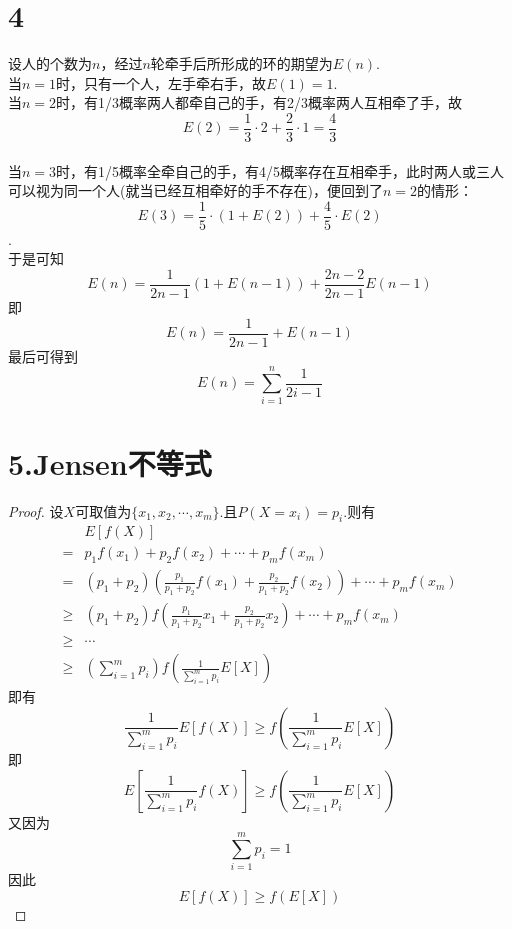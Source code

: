 \documentclass[twocolumn]{article}
\begin{document}
\begin{CJK}{UTF8}{gbsn}
			\section*{4}
				设人的个数为$n$，经过$n$轮牵手后所形成的环的期望为$E(n)$.\\
				当$n=1$时，只有一个人，左手牵右手，故$E(1)=1$.\\
				当$n=2$时，有1/3概率两人都牵自己的手，有2/3概率两人互相牵了手，故\[E(2)=\frac{1}{3}\cdot2+\frac{2}{3}\cdot1=\frac{4}{3}\]\\
				当$n=3$时，有1/5概率全牵自己的手，有4/5概率存在互相牵手，此时两人或三人可以视为同一个人(就当已经互相牵好的手不存在)，便回到了$n=2$的情形：\[E(3)=\frac{1}{5}\cdot(1+E(2))+\frac{4}{5}\cdot E(2)\].\\
				于是可知\[E(n)=\frac{1}{2n-1}(1+E(n-1))+\frac{2n-2}{2n-1}E(n-1)\]即\[E(n)=\frac{1}{2n-1}+E(n-1)\]最后可得到\[E(n)=\sum_{i=1}^{n}\frac{1}{2i-1}\]
			\section*{5.Jensen不等式}
				\begin{proof}
					设$X$可取值为$\{x_1,x_2,\cdots,x_m\}$.且$P(X=x_i)=p_i$.则有\begin{align*}
						  & E[f(X)] \\
						= & p_1f(x_1)+p_2f(x_2)+\cdots+p_mf(x_m) \\
						= & (p_1+p_2)(\frac{p_1}{p_1+p_2}f(x_1)+\frac{p_2}{p_1+p_2}f(x_2))+\cdots+p_mf(x_m) \\
						\ge & (p_1+p_2)f(\frac{p_1}{p_1+p_2}x_1+\frac{p_2}{p_1+p_2}x_2)+\cdots+p_mf(x_m) \\
						\ge & \cdots \\
						\ge & (\sum_{i=1}^{m}p_i)f(\frac{1}{\sum_{i=1}^{m}p_i}E[X])
					\end{align*}
					即有\[\frac{1}{\sum_{i=1}^{m}p_i}E[f(X)]\ge f(\frac{1}{\sum_{i=1}^{m}p_i}E[X])\]
					即\[E[\frac{1}{\sum_{i=1}^{m}p_i}f(X)]\ge f(\frac{1}{\sum_{i=1}^{m}p_i}E[X])\]
					又因为\[\sum_{i=1}^{m}p_i=1\]因此\[E[f(X)]\ge f(E[X])\]
					
				\end{proof}
	\end{CJK}
\end{document}
